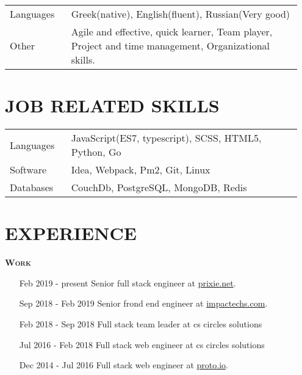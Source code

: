 \documentclass[margin, 10pt]{res} %
\begin{document}
\begin{resume}
\begin{tabular}{p{0.2\linewidth} p{0.75\linewidth}}
            Languages & Greek(native), English(fluent), Russian(Very good)                    \\
            Other & Agile and effective, quick learner, Team player, Project and time management, Organizational skills.

        \end{tabular}

        \section{JOB RELATED SKILLS}

        \begin{tabular}{p{0.2\linewidth} p{0.75\linewidth}}

            Languages & JavaScript(ES7, typescript), SCSS, HTML5, Python, Go \\
            Software & Idea, Webpack, Pm2, Git, Linux \\
            Databases & CouchDb, PostgreSQL, MongoDB, Redis

        \end{tabular}

        \section{EXPERIENCE}

        \textsc{ \textbf{Work}}

        \begin{itemize}
            \item[Feb 2019 - present] Senior full stack engineer at \href{http://prixie.net}{prixie.net}.  \\

            \item[Sep 2018 - Feb 2019] Senior frond end engineer at \href{http://impactechs.com}{impactechs.com}.  \\

            \item[Feb 2018 - Sep 2018] Full stack team leader at cs circles solutions  \\

            \item[Jul 2016 - Feb 2018] Full stack web engineer at cs circles solutions \\

            \item[Dec 2014 - Jul 2016] Full stack web engineer at
            \href{https://proto.io/}{proto.io}. \\


\end{itemize}
\end{resume}
\end{document}
